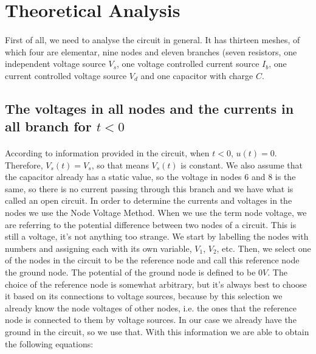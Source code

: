 \section{Theoretical Analysis}  \label{sec:analysis}

\paragraph{} First of all, we need to analyse the circuit in general. It has thirteen meshes, of which four are elementar,
nine nodes and eleven branches (seven resistors, one independent voltage source $V_s$, one voltage controlled current
source $I_b$, one current controlled voltage source $V_d$ and one capacitor with charge $C$.

\subsection{The voltages in all nodes and the currents in all branch for $t<0$} \label{2.1}

\paragraph{} According to information provided in the circuit, when $t<0$, $u(t)=0$. Therefore, $V_s(t)=V_s$, so that means $V_s(t)$ is constant.
We also assume that the capacitor already has a static value,
so the voltage in nodes 6 and 8 is the same, so there is no current passing through this branch and we have what is called an open
circuit. In order to determine the currents and voltages in the nodes we use the Node Voltage Method. When we use the term
node voltage, we are referring to the potential difference between two nodes of a circuit. This is still a voltage,
it's not anything too strange. We start by labelling the nodes with numbers and assigning each with its own variable,
$V_1$, $V_2$, etc. Then, we select one of the nodes in the circuit to be the reference node and call this reference
node the ground node. The potential of the ground node is defined to be $0 V$. The choice of the reference node is
somewhat arbitrary, but it's always best to choose it based on its connections to voltage sources, because by this
selection we already know the node voltages of other nodes, i.e. the ones that the reference node is connected to
them by voltage sources. In our case we already have the ground in the circuit, so we use that. With this information
we are able to obtain the following equations:

